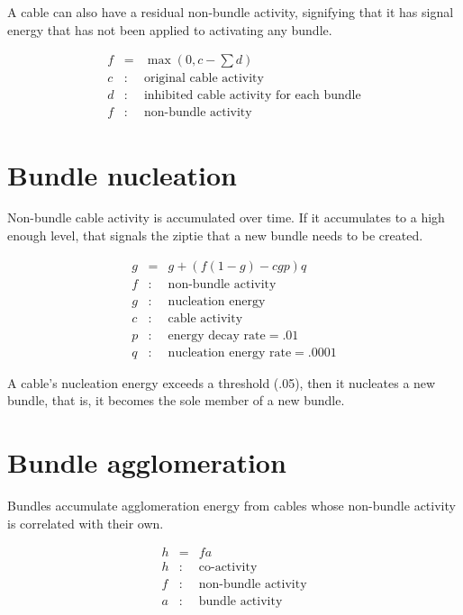\documentclass[oneside,twocolumn]{article}
\begin{document}
A cable can also have a residual non-bundle activity, signifying that it has signal energy that has not been applied to activating any bundle.

\begin{eqnarray*}
f &=& \max \left (0, c - \sum d \right)\\ 
c &:& \mbox{original cable activity}\\
d &:& \mbox{inhibited cable activity for each bundle}\\
f &:& \mbox{non-bundle activity}
\end{eqnarray*}

\section*{\color{copper} Bundle nucleation}

Non-bundle cable activity is accumulated over time. If it accumulates to a high enough level, that signals the ziptie that a new bundle needs to be created.

\begin{eqnarray*}
g &=& g + (f  (1 - g)  - c  g  p )  q\\ 
f &:& \mbox{non-bundle activity}\\
g &:& \mbox{nucleation energy}\\
c &:& \mbox{cable activity}\\
p &:& \mbox{energy decay rate} = .01\\
q &:& \mbox{nucleation energy rate} = .0001
\end{eqnarray*}

A cable's nucleation energy exceeds a threshold (.05),  then it nucleates a new bundle, that is, it becomes the sole member of a new bundle.
          
\section*{\color{copper} Bundle agglomeration}

Bundles accumulate agglomeration energy from cables whose non-bundle activity is correlated with their own. 

\begin{eqnarray*}
h &=& fa\\ 
h &:& \mbox{co-activity}\\
f &:& \mbox{non-bundle activity}\\
a &:& \mbox{bundle activity}\\
\end{eqnarray*}
\end{document}
